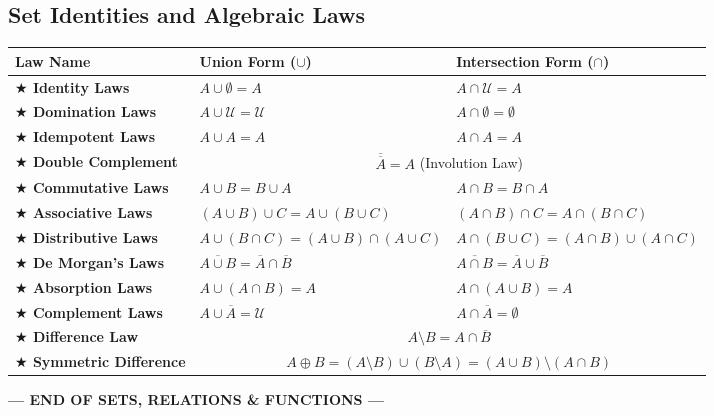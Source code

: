 \documentclass[11pt,a4paper]{article}
\begin{document}
\subsection{Set Identities and Algebraic Laws}
\begin{examplebox}
\renewcommand{\arraystretch}{1.12}
\begin{tabularx}{\linewidth}{@{}l X X@{}}
\toprule
\textbf{\color{navy}Law Name} & \textbf{\color{teal}Union Form ($\cup$)} & \textbf{\color{teal}Intersection Form ($\cap$)} \\
\midrule
\textbf{\color{gold!90!black}$\bigstar$ Identity Laws} & $A \cup \emptyset = A$ & $A \cap \mathcal{U} = A$ \\
\textbf{\color{gold!90!black}$\bigstar$ Domination Laws} & $A \cup \mathcal{U} = \mathcal{U}$ & $A \cap \emptyset = \emptyset$ \\
\textbf{\color{gold!90!black}$\bigstar$ Idempotent Laws} & $A \cup A = A$ & $A \cap A = A$ \\
\textbf{\color{gold!90!black}$\bigstar$ Double Complement} & \multicolumn{2}{c}{$\overline{\overline{A}} = A$ \quad (Involution Law)} \\
\textbf{\color{gold!90!black}$\bigstar$ Commutative Laws} & $A \cup B = B \cup A$ & $A \cap B = B \cap A$ \\
\textbf{\color{gold!90!black}$\bigstar$ Associative Laws} & $(A \cup B) \cup C = A \cup (B \cup C)$ & $(A \cap B) \cap C = A \cap (B \cap C)$ \\
\textbf{\color{gold!90!black}$\bigstar$ Distributive Laws} & $A \cup (B \cap C) = (A \cup B) \cap (A \cup C)$ & $A \cap (B \cup C) = (A \cap B) \cup (A \cap C)$ \\
\textbf{\color{gold!90!black}$\bigstar$ De Morgan's Laws} & $\overline{A \cup B} = \overline{A} \cap \overline{B}$ & $\overline{A \cap B} = \overline{A} \cup \overline{B}$ \\
\textbf{\color{gold!90!black}$\bigstar$ Absorption Laws} & $A \cup (A \cap B) = A$ & $A \cap (A \cup B) = A$ \\
\textbf{\color{gold!90!black}$\bigstar$ Complement Laws} & $A \cup \overline{A} = \mathcal{U}$ & $A \cap \overline{A} = \emptyset$ \\
\textbf{\color{gold!90!black}$\bigstar$ Difference Law} & \multicolumn{2}{c}{$A \setminus B = A \cap \overline{B}$} \\
\textbf{\color{gold!90!black}$\bigstar$ Symmetric Difference} & \multicolumn{2}{c}{$A \oplus B = (A \setminus B) \cup (B \setminus A) = (A \cup B) \setminus (A \cap B)$} \\
\bottomrule
\end{tabularx}
\end{examplebox}

\vspace{6pt}
\begin{center}
{\small\color{navy}\textbf{--- END OF SETS, RELATIONS \& FUNCTIONS ---}}
\end{center}
\end{document}
